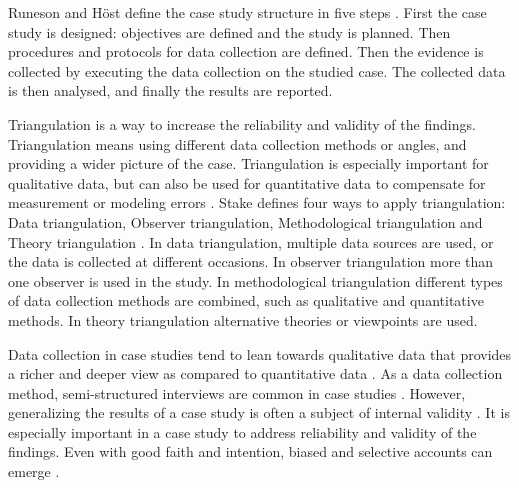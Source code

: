 \documentclass[english]{tktltiki2}
\theoremstyle{definition}
\theoremstyle{remark}
\begin{document}
Runeson and Höst define the case study structure in five steps \cite{runeson2009guidelines}. First the case study is designed: objectives are defined and the study is planned. Then procedures and protocols for data collection are defined. Then the evidence is collected by executing the data collection on the studied case. The collected data is then analysed, and finally the results are reported.

Triangulation is a way to increase the reliability and validity of the findings. Triangulation means using different data collection methods or angles, and providing a wider picture of the case. Triangulation is especially important for qualitative data, but can also be used for quantitative data to compensate for measurement or modeling errors \cite{runeson2009guidelines}. Stake defines four ways to apply triangulation: Data triangulation, Observer triangulation, Methodological triangulation and Theory triangulation \cite{stake1995art}. In data triangulation, multiple data sources are used, or the data is collected at different occasions. In observer triangulation more than one observer is used in the study. In methodological triangulation different types of data collection methods are combined, such as qualitative and quantitative methods. In theory triangulation alternative theories or viewpoints are used.

Data collection in case studies tend to lean towards qualitative data that provides a richer and deeper view as compared to quantitative data \cite{runeson2009guidelines}. As a data collection method, semi-structured interviews are common in case studies \cite{runeson2009guidelines}. However, generalizing the results of a case study is often a subject of internal validity \cite{kitchenham2002preliminary}. It is especially important in a case study to address reliability and validity of the findings. Even with good faith and intention, biased and selective accounts can emerge \cite{robson2002real}. 
\end{document}

